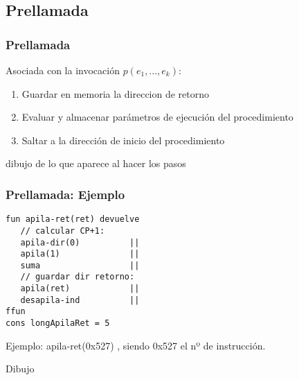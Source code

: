 \documentclass[hyperref={pdfpagelabels=false},tree-dvips]{beamer}
\begin{document}
\subsection{Prellamada}
\begin{frame}[fragile]
\frametitle{Prellamada}

Asociada con la invocación $p(e_1,...,e_k)$:
\begin{enumerate}[<+->]
    \item Guardar en memoria la direccion de retorno
    \item Evaluar y almacenar parámetros de ejecución del procedimiento
    \item Saltar a la dirección de inicio del procedimiento
\end{enumerate}

dibujo de lo que aparece al hacer los pasos


\end{frame}
\begin{frame}[fragile]
\frametitle{Prellamada: Ejemplo}

\begin{lstlisting}[style=codigoMP]
fun apila-ret(ret) devuelve
   // calcular CP+1:
   apila-dir(0)          ||
   apila(1)              ||
   suma                  ||
   // guardar dir retorno:
   apila(ret)            ||
   desapila-ind          ||
ffun
cons longApilaRet = 5
\end{lstlisting}

Ejemplo: apila-ret(0x527) , siendo 0x527 el nº de instrucción.

Dibujo

\end{frame}
\end{document}
